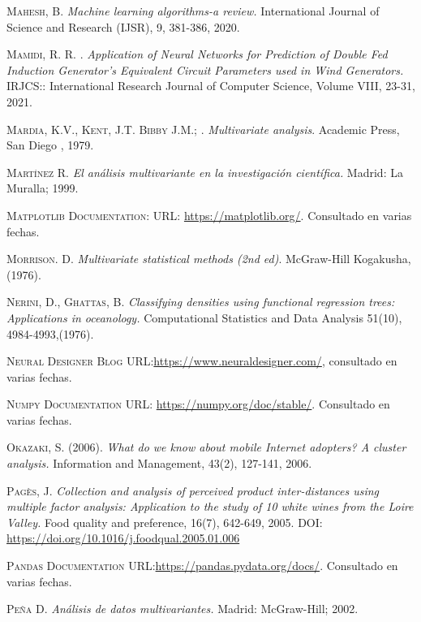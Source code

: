 \begin{thebibliography}{99}
\textsc{Mahesh, B. } \emph{Machine learning algorithms-a review.} International Journal of Science and Research (IJSR), 9, 381-386, 2020.

\textsc{Mamidi, R. R. }. \emph{Application of Neural Networks for Prediction of Double Fed Induction Generator’s Equivalent Circuit Parameters used in Wind Generators.} IRJCS:: International Research Journal of Computer Science, Volume VIII, 23-31, 2021.

\textsc{Mardia, K.V., Kent, J.T. Bibby J.M.; }. \emph{Multivariate analysis}. Academic Press, San Diego , 1979.

\textsc{Martínez R.} \emph{El análisis multivariante en la investigación científica.} Madrid: La Muralla; 1999.

\textsc{Matplotlib Documentation:} URL: \url{https://matplotlib.org/}. Consultado en varias fechas. 

\textsc{Morrison. D.}\textit{ Multivariate statistical methods (2nd ed)}. McGraw-Hill Kogakusha,(1976).

\textsc{Nerini, D.,  Ghattas, B. }\emph{ Classifying densities using functional regression trees: Applications in oceanology.} Computational Statistics and Data Analysis 51(10), 4984-4993,(1976).

 \textsc{Neural Designer Blog} URL:\url{https://www.neuraldesigner.com/}, consultado en varias fechas.

\textsc{Numpy Documentation} URL: \url{https://numpy.org/doc/stable/}. Consultado en varias fechas.

\textsc{Okazaki, S. (2006).}\emph{ What do we know about mobile Internet adopters? A cluster analysis.} Information and Management, 43(2), 127-141, 2006.

\textsc{Pagès, J. } \emph{Collection and analysis of perceived product inter-distances using multiple factor analysis: Application to the study of 10 white wines from the Loire Valley.} Food quality and preference, 16(7), 642-649, 2005. DOI: \url{https://doi.org/10.1016/j.foodqual.2005.01.006
}

 \textsc{Pandas Documentation} URL:\url{https://pandas.pydata.org/docs/}. Consultado en varias fechas.

\textsc{Peña D.} \emph{Análisis de datos multivariantes.} Madrid: McGraw-Hill; 2002.


\end{thebibliography}
